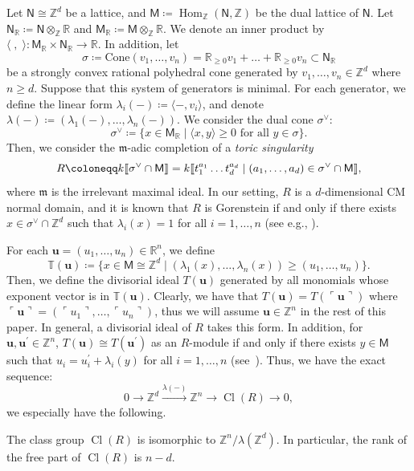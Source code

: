 \documentclass[ALCO,ThmDefs,Unicode]{cedram}
\newcommand{\fkm}{\mathfrak{m}}
\newcommand{\ZZ}{\mathbb{Z}}
\newcommand{\RR}{\mathbb{R}}
\newcommand{\sfM}{\mathsf{M}}
\newcommand{\sfN}{\mathsf{N}}
\DeclareMathOperator{\Hom}{Hom}
\DeclareMathOperator{\Cl}{Cl}
\newcommand{\llbracket}{\mathopen{[\mkern -2.7mu[}}
\newcommand{\rrbracket}{\mathclose{]\mkern -2.7mu]}}
\begin{document}
Let $\sfN\cong\ZZ^d$ be a lattice, and $\sfM\coloneqq\Hom_\ZZ(\sfN, \ZZ)$ be the dual lattice of $\sfN$. Let $\sfN_\RR\coloneqq\sfN\otimes_\ZZ\RR$ and $\sfM_\RR\coloneqq\sfM\otimes_\ZZ\RR$. We denote an inner product by $\langle\;,\;\rangle:\sfM_\RR\times\sfN_\RR\rightarrow\RR$. In addition, let
\[
\sigma\coloneqq\mathrm{Cone}(v_1, \ldots, v_n)=\RR_{\ge 0}v_1+\dots +\RR_{\ge 0}v_n
\subset\sfN_\RR
\]
be a strongly convex rational polyhedral cone generated by $v_1, \ldots, v_n\in\ZZ^d$ where $n\ge d$. Suppose that this system of generators is minimal. For each generator, we define the linear form $\lambda_i(-)\coloneqq\langle-, v_i\rangle$, and denote $\lambda(-)\coloneqq(\lambda_1(-),\dots,\lambda_n(-))$. We consider the dual cone $\sigma^\vee$:
\[
\sigma^\vee\coloneqq\{x\in\sfM_\RR \mid \langle x,y\rangle\ge0 \text{ for all } y\in\sigma \}.
\]
Then, we consider the $\fkm$-adic completion of a \emph{toric singularity}
\[
R\coloneqq k\llbracket \sigma^\vee\cap\sfM\rrbracket =k\llbracket t_1^{a_1}\dots t_d^{a_d}\mid (a_1, \ldots, a_d)\in\sigma^\vee\cap\sfM\rrbracket ,
\]
where $\fkm$ is the irrelevant maximal ideal. In our setting, $R$ is a $d$-dimensional CM normal domain, and it is known that $R$ is Gorenstein if and only if there exists $x\in\sigma^\vee\cap\ZZ^d$ such that $\lambda_i(x)=1$ for all $i=1, \ldots, n$ (see e.g., \cite[Theorem~6.33]{BG2}).

For each $\mathbf{u}=(u_1, \ldots, u_n)\in\RR^n$, we define
\[
\mathbb{T}(\mathbf{u})\coloneqq\{x\in\sfM\cong\ZZ^d \mid (\lambda_1(x), \ldots, \lambda_n(x))\ge(u_1, \ldots, u_n)\}.
\]
Then, we define the divisorial ideal $T(\mathbf{u})$ generated by all monomials whose exponent vector is in $\mathbb{T}(\mathbf{u})$. Clearly, we have that $T(\mathbf{u})=T(\ulcorner \mathbf{u}\urcorner)$ where $\ulcorner \mathbf{u}\urcorner=(\ulcorner u_1\urcorner, \ldots, \ulcorner u_n\urcorner)$, thus we will assume $\mathbf{u}\in\ZZ^n$ in the rest of this paper. In general, a divisorial ideal of $R$ takes this form. In addition, for $\mathbf{u}, \mathbf{u}^\prime\in\ZZ^n$, $T(\mathbf{u})\cong T(\mathbf{u}^\prime)$ as an $R$-module if and only if there exists $y\in\sfM$ such that $u_i=u_i^\prime+\lambda_i(y)$ for all $i=1, \ldots, n$ (see~\cite[Corollary~4.56]{BG2}). Thus, we have the exact sequence:
\[
0\rightarrow\ZZ^d\xrightarrow{\lambda(-)}\ZZ^n\rightarrow\Cl(R)\rightarrow0,
\]
we especially have the following.

\begin{lemm}\label{cl_toric}
The class group $\Cl(R)$ is isomorphic to $\ZZ^n/\lambda(\ZZ^d)$. In particular, the rank of the free part of $\Cl(R)$ is $n-d$.
\end{lemm}
\end{document}
